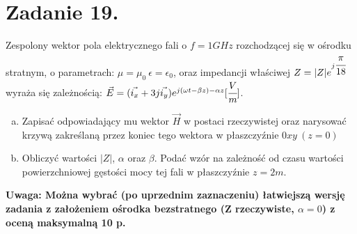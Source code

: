 \section*{Zadanie 19.}
\begin{task}
Zespolony wektor pola elektrycznego fali o $f=1 GHz$ rozchodzącej się w ośrodku stratnym, o parametrach: $\mu=\mu_{0} \ \epsilon=\epsilon_{0}$, oraz impedancji właściwej $Z=|Z|e^{j\cfrac{\pi}{18}}$ wyraża się zależnością: $\vec{E}=(\vec{i_{x}}+3j\vec{i_{y}})e^{j(\omega t - \beta z) - \alpha z} [\cfrac{V}{m}]$.
\begin{enumerate}[a)]
\item Zapisać odpowiadający mu wektor $\vec{H}$ w postaci rzeczywistej oraz narysować krzywą zakreślaną przez koniec tego wektora w płaszczyźnie $0xy\ (z=0)$
\item Obliczyć wartości $|Z|$, $\alpha$ oraz $\beta$. Podać wzór na zależność od czasu wartości powierzchniowej gęstości mocy tej fali w płaszczyźnie $z=2m$. 
\end{enumerate}
\textbf{Uwaga: Można wybrać (po uprzednim zaznaczeniu) łatwiejszą wersję zadania z założeniem
ośrodka bezstratnego (Z rzeczywiste, $\alpha=0$) z oceną maksymalną 10 p.}\\
\end{task}

